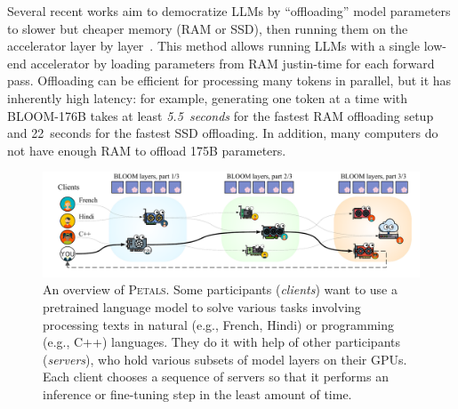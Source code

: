 Several recent works aim to democratize LLMs
by ``offloading'' model parameters to slower but cheaper memory (RAM or SSD), then running them on the accelerator layer by layer~\citep{l2l,zerooffload}\nocite{accelerate}.
This method allows running LLMs with a single low-end accelerator by loading parameters from RAM justin-time for each forward pass.
Offloading can be efficient for processing many tokens in parallel, but it has inherently high latency: for example, generating one token at a time with BLOOM-176B takes at least \textit{5.5~seconds} for the fastest RAM offloading setup and 22~seconds for the fastest SSD offloading. In addition, many computers do not have enough RAM to offload 175B parameters.

\begin{figure}[t]
    \centering
    \vspace{-16pt}
    \includegraphics[width=\linewidth]{resources/bloom_swarm_v9a.pdf}
    \vspace{-16pt}
    \caption{An overview of \textsc{Petals}. Some participants (\textit{clients}) want to use a pretrained language model to solve various tasks involving processing texts in natural (e.g., French, Hindi) or programming (e.g., C++) languages. They do it with help of other participants (\textit{servers}), who hold various subsets of model layers on their GPUs. Each client chooses a sequence of servers so that it performs an inference or fine-tuning step in the least amount of time.}
    \label{fig:overview}
    \vspace{-12pt}
\end{figure}

